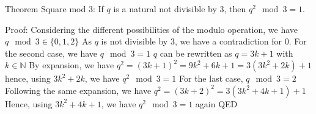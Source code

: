 Theorem Square mod 3:
If $q$ is a natural not divisible by $3$, then $q^2 \mod 3 = 1$.


Proof:
Considering the different possibilities of the modulo operation, we have $q \mod 3 \in \{ 0, 1, 2 \}$
As $q$ is not divisible by $3$, we have a contradiction for $0$.
For the second case, we have $q \mod 3 = 1$
    $q$ can be rewritten as $q = 3k + 1$ with $k \in \mathbb{N}$
    By expansion, we have $q^2 = (3k+1)^2 = 9k^2+6k+1 = 3(3k^2 + 2k) + 1$
    hence, using $3k^2 + 2k$, we have $q^2 \mod 3 = 1$
For the last case, $q \mod 3 = 2$
    Following the same expansion, we have $q^2 = (3k+2)^2 = 3(3k^2+4k+1) +1$
    Hence, using $3k^2 + 4k + 1$, we have $q^2 \mod 3 = 1$ again
QED